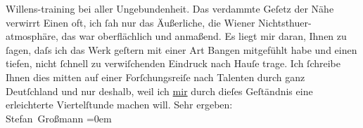 \begin{ledgroupsized}[t]{13cm}
               Willens-training bei aller Ungebundenheit.\pend
           \pstart
           Das verdammte Geſetz der Nähe verwirrt Einen oft, ich ſah nur {\pb}das Äußerliche, die Wiener Nichtsthuer-atmosphäre, das war oberflächlich und anmaßend.\pend
           \pstart
           Es liegt mir daran, Ihnen zu ſagen, daſs ich das Werk geſtern mit einer Art Bangen
               mitgefühlt habe und einen tiefen, nicht ſchnell zu verwiſchenden Eindruck nach Hauſe
               trage.\pend
           \pstart
           Ich ſchreibe Ihnen dies mitten auf einer Forſchungsreiſe nach Talenten durch ganz Deutſchland und nur deshalb, {\pb}weil ich \uline{mir}
               durch dieſes Geſtändnis eine erleichterte Viertelſtunde machen will.\pend
           \pstart
           Sehr ergeben:{\\[\baselineskip]}\spacefill\mbox{Stefan Großmann}\pend
           \leftskip=0em{}\endnumbering{}\end{ledgroupsized}  \newcommand{\dateiname}{L02052}\newcommand{\titel}{Stefan Großmann an Arthur Schnitzler, 5. 2. 1912}\newcommand{\editorInnen}{ Martin Anton Müller und Gerd-Hermann Susen}
      